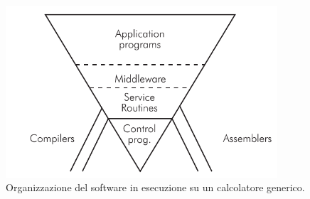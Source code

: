 \begin{figure}[h]
    \centering
    \includegraphics[width=0.9\textwidth]{figs/chapter2/software_pyramid.png}
    \caption{Organizzazione del software in esecuzione su un calcolatore generico.}
    \label{fig:sw_pyramid}
\end{figure}

